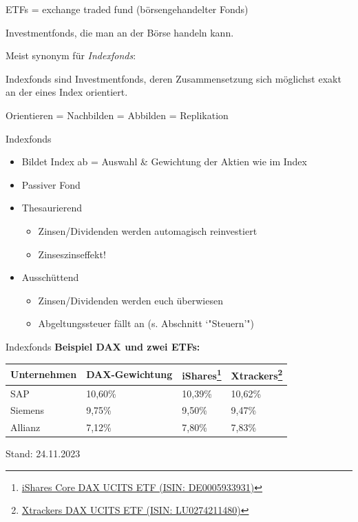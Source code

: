 \documentclass{beamer}
\begin{document}
			\begin{frame}
				ETFs = exchange traded fund (börsengehandelter Fonds)
				\begin{definition}
					Investmentfonds, die man an der Börse handeln kann.
				\end{definition}
				Meist synonym für \textit{Indexfonds}:\pause
				\begin{definition}
					Indexfonds sind Investmentfonds, deren Zusammensetzung sich möglichst exakt an der eines Index orientiert.\citewiki{Indexfonds}
				\end{definition}
				Orientieren = Nachbilden = Abbilden = Replikation
			\end{frame}
		
			\begin{frame}{Indexfonds}
				\begin{itemize}
					\item Bildet Index ab = Auswahl \& Gewichtung der Aktien wie im Index
					\item Passiver Fond\pause
					\item Thesaurierend
					\begin{itemize}
						\item Zinsen/Dividenden werden automagisch reinvestiert
						\item Zinseszinseffekt!
					\end{itemize}\pause
					\item Ausschüttend
					\begin{itemize}
						\item Zinsen/Dividenden werden euch überwiesen
						\item Abgeltungssteuer fällt an (s. Abschnitt `"Steuern'")
					\end{itemize}
				\end{itemize}
			\end{frame}
		
			\begin{frame}{Indexfonds}
				\textbf{Beispiel DAX und zwei ETFs:}
				\vspace{0.25cm}
				\begin{tabularx}{\linewidth}{X|p{3cm}|X|X}
					Unternehmen & DAX-Gewichtung & iShares\footnote{\href{https://de.extraetf.com/etf-profile/DE0005933931?tab=components}{iShares Core DAX UCITS ETF (ISIN: DE0005933931)}} & Xtrackers\footnote{\href{https://de.extraetf.com/etf-profile/LU0274211480?tab=components}{Xtrackers DAX UCITS ETF (ISIN: LU0274211480)}}\\
					\hline
					SAP		& 10,60\%	& 10,39\%	& 10,62\% \\
					Siemens	&  9,75\%	&  9,50\%	&  9,47\% \\
					Allianz	&  7,12\%	&  7,80\%	&  7,83\%
				\end{tabularx}
				{\tiny Stand: 24.11.2023}
			\end{frame}
		
\end{document}
